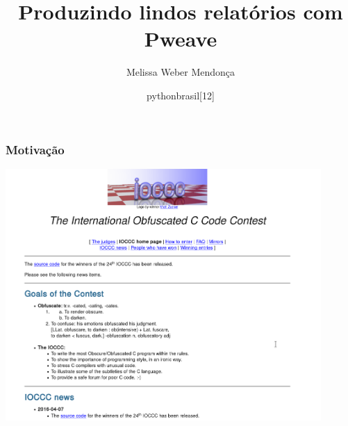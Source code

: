 \documentclass{beamer}
\title{Produzindo lindos relatórios com Pweave}
\author{Melissa Weber Mendonça}
\date{pythonbrasil[12]}
\begin{document}
{%
\begin{frame}%

   \titlepage%
   
 \end{frame}%
}

\begin{frame}
  \frametitle{Motivação}
  \begin{center}
    \includegraphics[width=0.9\textwidth]{obfuscated.png}
  \end{center}
\end{frame}
\end{document}
